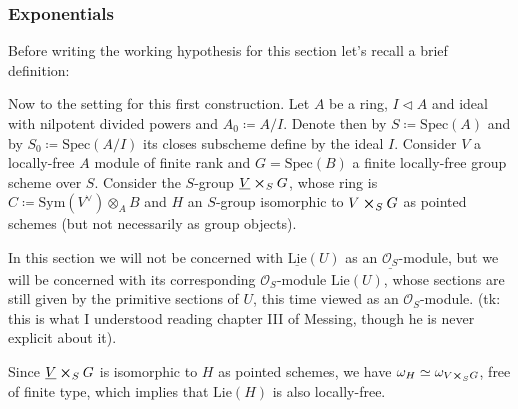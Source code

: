 \documentclass[../Main]{subfiles}
\begin{document}
\subsubsection{Exponentials}
Before writing the working hypothesis for this section
let's recall a brief definition:


Now to the setting for this first construction.
Let $A$ be a ring, $I \triangleleft A$ and ideal with nilpotent
divided powers and $A_0 \coloneqq A/I$.
Denote then by $S \coloneqq \mathrm{Spec}(A)$
and by $S_0 \coloneqq \mathrm{Spec}(A/I)$ its closes
subscheme define by the ideal $I$.
Consider $V$ a locally-free $A$ module of finite rank
and $G = \mathrm{Spec}(B)$ a finite locally-free 
group scheme over $S$.
Consider the $S$-group $\underline{V} \cross_{ S } G$, whose ring is
$C \coloneqq \mathrm{Sym}(V^\vee) \otimes_A B$ and $H$ an $S$-group isomorphic
to $V \cross_{ S } G$ as pointed schemes (but not necessarily
as group objects).


\begin{rem}[]
	In this section we will not be concerned with $\underline{\mathrm{Lie}}(U)$
	as an $\underline{\mathcal{O}_{ S }}$-module, but we will be concerned 
	with its corresponding $\mathcal{O}_{ S }$-module $\mathrm{Lie}(U)$, 
	whose sections are still given by the primitive sections of $U$,
	this time viewed as an $\mathcal{O}_{ S }$-module.
	(tk: this is what I understood reading chapter III of Messing,
	though he is never explicit about it).
\end{rem}


\begin{rem}[]
	Since $\underline{V} \cross_{ S } G$ is isomorphic to $H$ as pointed
	schemes, we have $\omega_H \simeq \omega_{V \cross_S G}$, free of finite type,
	which implies that $\mathrm{Lie}(H)$ is also locally-free.
\end{rem}
\end{document}

